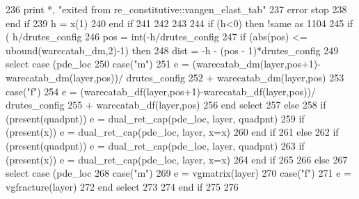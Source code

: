 \begin{DoxyCode}
236           print *, \textcolor{stringliteral}{"exited from re\_constitutive::vangen\_elast\_tab"}
237           error stop
238 \textcolor{keywordflow}{        end if}
239         h = x(1)
240 \textcolor{keywordflow}{      end if}
241 
242 
243      
244       \textcolor{keywordflow}{if} (h<0) \textcolor{keywordflow}{then} \textcolor{comment}{!same as 1104}
245         \textcolor{keywordflow}{if} ( h/drutes_config%
246           pos = int(-h/drutes_config%
247           \textcolor{keywordflow}{if} (abs(pos) <= ubound(warecatab\_dm,2)-1) \textcolor{keywordflow}{then}
248             dist = -h - (pos - 1)*drutes_config%
249             \textcolor{keywordflow}{select case} (pde\_loc%
250               \textcolor{keywordflow}{case}(\textcolor{stringliteral}{"m"})
251                 e = (warecatab\_dm(layer,pos+1)-warecatab\_dm(layer,pos))/
      drutes_config%
252 \textcolor{comment}{                 + warecatab\_dm(layer,pos)}
253 \textcolor{comment}{              }\textcolor{keywordflow}{case}(\textcolor{stringliteral}{"f"})
254                 e = (warecatab\_df(layer,pos+1)-warecatab\_df(layer,pos))/
      drutes_config%
255 \textcolor{comment}{              + warecatab\_df(layer,pos)}
256 \textcolor{comment}{}\textcolor{keywordflow}{            end select}
257           \textcolor{keywordflow}{else}
258             \textcolor{keywordflow}{if} (\textcolor{keyword}{present}(quadpnt)) e = dual_ret_cap(pde\_loc, layer, quadpnt)
259             \textcolor{keywordflow}{if} (\textcolor{keyword}{present}(x)) e = dual_ret_cap(pde\_loc, layer, x=x)
260 \textcolor{keywordflow}{          end if}
261         \textcolor{keywordflow}{else}
262           \textcolor{keywordflow}{if} (\textcolor{keyword}{present}(quadpnt)) e = dual_ret_cap(pde\_loc, layer, quadpnt)
263           \textcolor{keywordflow}{if} (\textcolor{keyword}{present}(x)) e = dual_ret_cap(pde\_loc, layer, x=x)   
264 \textcolor{keywordflow}{        end if}
265         
266       \textcolor{keywordflow}{else}
267         \textcolor{keywordflow}{select case} (pde\_loc%
268           \textcolor{keywordflow}{case}(\textcolor{stringliteral}{"m"})
269             e = vgmatrix(layer)%
270           \textcolor{keywordflow}{case}(\textcolor{stringliteral}{"f"})
271             e = vgfracture(layer)%
272 \textcolor{keywordflow}{        end select}
273         
274 \textcolor{keywordflow}{      end if}
275 
276 
\end{DoxyCode}


